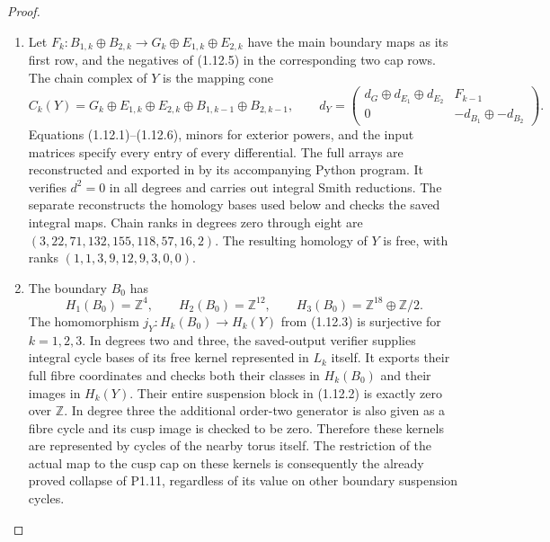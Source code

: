\begin{proof}
\begin{enumerate}[label=\arabic*.]
\item Let $F_k:B_{1,k}\oplus B_{2,k}\to G_k\oplus E_{1,k}\oplus E_{2,k}$
have the main boundary maps as its first row, and the negatives of
(1.12.5) in the corresponding two cap rows.  The chain complex of
$Y$ is the mapping cone
\[
C_k(Y)=G_k\oplus E_{1,k}\oplus E_{2,k}
       \oplus B_{1,k-1}\oplus B_{2,k-1},\qquad
d_Y=\begin{pmatrix}d_G\oplus d_{E_1}\oplus d_{E_2}&F_{k-1}\\
0&-d_{B_1}\oplus-d_{B_2}\end{pmatrix}.
\tag{1.12.6}
\]
Equations (1.12.1)--(1.12.6), minors for exterior powers, and the input
matrices specify every entry of every differential.
The full arrays are reconstructed and exported in
by its accompanying Python program.  It verifies $d^2=0$ in all
degrees and carries out integral Smith reductions.  The separate
reconstructs the homology bases used below and checks the saved
integral maps.  Chain ranks in degrees zero through eight are
$(3,22,71,132,155,118,57,16,2)$.
The resulting homology of $Y$ is free, with ranks
$(1,1,3,9,12,9,3,0,0)$.

\item The boundary $B_0$ has
\[
H_1(B_0)=\mathbb Z^4,\qquad H_2(B_0)=\mathbb Z^{12},\qquad
H_3(B_0)=\mathbb Z^{18}\oplus\mathbb Z/2.
\]
The homomorphism $j_Y:H_k(B_0)\to H_k(Y)$ from (1.12.3) is
surjective for $k=1,2,3$.  In degrees two and three, the saved-output verifier supplies integral
cycle bases of its free kernel represented in $L_k$ itself.  It
exports their full fibre coordinates and checks both their classes
in $H_k(B_0)$ and their images in $H_k(Y)$.  Their entire suspension
block in (1.12.2) is exactly zero over $\mathbb Z$.  In degree three
the additional order-two generator is also given as a fibre cycle
and its cusp image is checked to be zero.  Therefore these kernels are represented by cycles of
the nearby torus itself.  The restriction of the actual map to the
cusp cap on these kernels is consequently the already proved
collapse of P1.11, regardless of its value on other boundary
suspension cycles.


\end{enumerate}
\end{proof}
